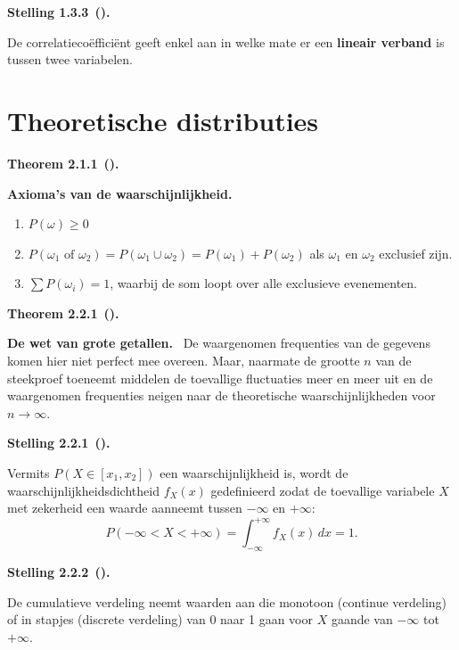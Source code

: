 \documentclass[10pt,a4paper]{article}
\newenvironment{res}[3][]{%
  \begin{tcolorbox}[
    breakable,          %
    colback=gray!10,    %
    colframe=gray!40,   %
    boxrule=0.5pt,      %
    left=6pt, right=6pt, top=6pt, bottom=6pt %
  ]
  \noindent\textbf{#2 #3}\if\relax\detokenize{#1}\relax\else\ \textbf{(#1)}\fi\textbf{.}~\ignorespaces
}{%
  \end{tcolorbox}
}
\newcommand{\restitle}[1]{\textbf{#1.}\ }
\begin{document}
\begin{res}{Stelling}{1.3.3}
De correlatieco\"effici\"ent geeft enkel aan in welke mate er een \textbf{lineair verband} is tussen twee variabelen.
\end{res}

\section{Theoretische distributies}

\begin{res}{Theorem}{2.1.1}
\restitle{Axioma's van de waarschijnlijkheid}
\begin{enumerate}[label=\arabic*.,leftmargin=1.8em,itemsep=1pt,topsep=1pt]
\item $P(\omega) \ge 0$
\item $P(\omega_1 \text{ of } \omega_2) = P(\omega_1 \cup \omega_2) = P(\omega_1) + P(\omega_2)$ als $\omega_1$ en $\omega_2$ exclusief zijn.
\item $\sum P(\omega_i) = 1$, waarbij de som loopt over alle exclusieve evenementen.
\end{enumerate}
\end{res}

\begin{res}{Theorem}{2.2.1}
\restitle{De wet van grote getallen}
De waargenomen frequenties van de gegevens komen hier niet perfect mee overeen. Maar, naarmate de grootte $n$ van de steekproef toeneemt middelen de toevallige fluctuaties meer en meer uit en de waargenomen frequenties neigen naar de theoretische waarschijnlijkheden voor $n\to\infty$.
\end{res}

\begin{res}{Stelling}{2.2.1}
Vermits $P(X\in[x_1,x_2])$ een waarschijnlijkheid is, wordt de waarschijnlijkheidsdichtheid $f_X(x)$ gedefinieerd zodat de toevallige variabele $X$ met zekerheid een waarde aanneemt tussen $-\infty$ en $+\infty$:
\[
P(-\infty < X < +\infty) = \int_{-\infty}^{+\infty} f_X(x)\,dx = 1.
\]
\end{res}

\begin{res}{Stelling}{2.2.2}
De cumulatieve verdeling neemt waarden aan die monotoon (continue verdeling) of in stapjes (discrete verdeling) van 0 naar 1 gaan voor $X$ gaande van $-\infty$ tot $+\infty$.
\end{res}
\end{document}
